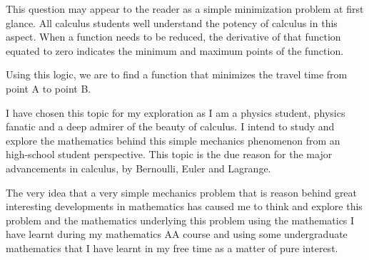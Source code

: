 {This question may appear to the reader as a simple minimization problem at first glance. All calculus students well understand the potency of calculus in this aspect. When a function needs to be reduced, the derivative of that function equated to zero indicates the minimum and maximum points of the function.}

{Using this logic, we are to find a function that minimizes the travel time from point A to point B.}

{I have chosen this topic for my exploration as I am a physics student, physics fanatic and a deep admirer of the beauty of calculus. I intend to study and explore the mathematics behind this simple mechanics phenomenon from an high-school student perspective. This topic is the due reason for the major advancements in calculus, by Bernoulli, Euler and Lagrange.}

{The very idea that a very simple mechanics problem that is reason behind great interesting developments in mathematics has caused me to think and explore this problem and the mathematics underlying this problem using the mathematics I have learnt during my mathematics AA course and using some undergraduate mathematics that I have learnt in my free time as a matter of pure interest.}


